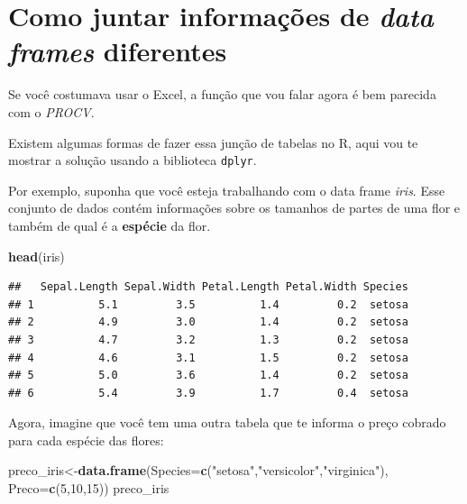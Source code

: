 \documentclass[
]{book}
\newenvironment{Shaded}{\begin{snugshade}}{\end{snugshade}}
\newcommand{\DataTypeTok}[1]{\textcolor[rgb]{0.13,0.29,0.53}{#1}}
\newcommand{\DecValTok}[1]{\textcolor[rgb]{0.00,0.00,0.81}{#1}}
\newcommand{\KeywordTok}[1]{\textcolor[rgb]{0.13,0.29,0.53}{\textbf{#1}}}
\newcommand{\NormalTok}[1]{#1}
\newcommand{\StringTok}[1]{\textcolor[rgb]{0.31,0.60,0.02}{#1}}
\begin{document}
\hypertarget{como-juntar-informauxe7uxf5es-de-data-frames-diferentes}{%
\section{\texorpdfstring{Como juntar informações de \emph{data frames}
diferentes}{Como juntar informações de data frames diferentes}}\label{como-juntar-informauxe7uxf5es-de-data-frames-diferentes}}

Se você costumava usar o Excel, a função que vou falar agora é bem
parecida com o \emph{PROCV}.

Existem algumas formas de fazer essa junção de tabelas no R, aqui vou te
mostrar a solução usando a biblioteca \texttt{dplyr}.

Por exemplo, suponha que você esteja trabalhando com o data frame
\emph{iris}. Esse conjunto de dados contém informações sobre os tamanhos
de partes de uma flor e também de qual é a \textbf{espécie} da flor.

\begin{Shaded}
\begin{Highlighting}[]
\KeywordTok{head}\NormalTok{(iris)}
\end{Highlighting}
\end{Shaded}

\begin{verbatim}
##   Sepal.Length Sepal.Width Petal.Length Petal.Width Species
## 1          5.1         3.5          1.4         0.2  setosa
## 2          4.9         3.0          1.4         0.2  setosa
## 3          4.7         3.2          1.3         0.2  setosa
## 4          4.6         3.1          1.5         0.2  setosa
## 5          5.0         3.6          1.4         0.2  setosa
## 6          5.4         3.9          1.7         0.4  setosa
\end{verbatim}

Agora, imagine que você tem uma outra tabela que te informa o preço
cobrado para cada espécie das flores:

\begin{Shaded}
\begin{Highlighting}[]
\NormalTok{preco_iris<-}\KeywordTok{data.frame}\NormalTok{(}\DataTypeTok{Species=}\KeywordTok{c}\NormalTok{(}\StringTok{"setosa"}\NormalTok{,}\StringTok{"versicolor"}\NormalTok{,}\StringTok{"virginica"}\NormalTok{),}
                       \DataTypeTok{Preco=}\KeywordTok{c}\NormalTok{(}\DecValTok{5}\NormalTok{,}\DecValTok{10}\NormalTok{,}\DecValTok{15}\NormalTok{))}
\NormalTok{preco_iris}
\end{Highlighting}
\end{Shaded}
\end{document}
